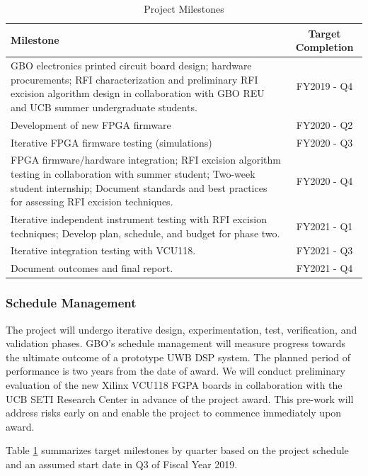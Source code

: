\documentclass[10pt]{myNSF}
\begin{document}
\begin{table}[t]
  \centering
  \caption{Project Milestones \label{table:milestones}}
  \begin{tabular}{|p{5in}|c|}
    \hline
    Milestone & Target Completion \\
    \hline
    GBO electronics printed circuit board design; hardware procurements; RFI characterization and preliminary RFI excision algorithm design in collaboration with GBO REU and UCB summer undergraduate students. & FY2019 - Q4 \\
    \hline
    Development of new FPGA firmware & FY2020 - Q2 \\
    \hline
    Iterative FPGA firmware testing (simulations) & FY2020 - Q3 \\
    \hline
    FPGA firmware/hardware integration; RFI excision algorithm testing in collaboration with summer student; Two-week student internship; Document standards and best practices for assessing RFI excision techniques. & FY2020 - Q4 \\
    \hline
    Iterative independent instrument testing with RFI excision techniques; Develop plan, schedule, and budget for phase two. & FY2021 - Q1 \\
    \hline
    Iterative integration testing with VCU118. & FY2021 - Q3 \\
    \hline
    Document outcomes and final report. & FY2021 - Q4 \\
    \hline
  \end{tabular}
\end{table}

\subsubsection{Schedule Management}
\label{sec:schedule}

The project will undergo iterative design, experimentation, test,
verification, and validation phases. GBO's schedule management will
measure progress towards the ultimate outcome of a prototype UWB DSP
system. The planned period of performance is two years from the date
of award.  We will conduct preliminary evaluation of the new Xilinx
VCU118 FGPA boards in collaboration with the UCB SETI Research Center
in advance of the project award. This pre-work will address risks
early on and enable the project to commence immediately upon award.

Table \ref{table:milestones} summarizes target milestones by quarter
based on the project schedule and an assumed start date in Q3 of
Fiscal Year 2019.
\end{document}
